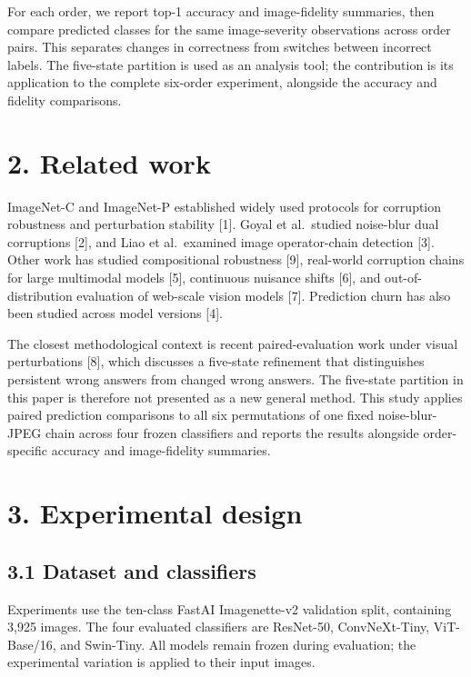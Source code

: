 \documentclass[10pt,twocolumn]{article}
\begin{document}
For each order, we report top-1 accuracy and image-fidelity summaries,
then compare predicted classes for the same image-severity observations
across order pairs. This separates changes in correctness from switches
between incorrect labels. The five-state partition is used as an
analysis tool; the contribution is its application to the complete
six-order experiment, alongside the accuracy and fidelity comparisons.

\section{2. Related work}\label{related-work}

ImageNet-C and ImageNet-P established widely used protocols for
corruption robustness and perturbation stability {[}1{]}. Goyal et
al.~studied noise-blur dual corruptions {[}2{]}, and Liao et
al.~examined image operator-chain detection {[}3{]}. Other work has
studied compositional robustness {[}9{]}, real-world corruption chains
for large multimodal models {[}5{]}, continuous nuisance shifts {[}6{]},
and out-of-distribution evaluation of web-scale vision models {[}7{]}.
Prediction churn has also been studied across model versions {[}4{]}.

The closest methodological context is recent paired-evaluation work
under visual perturbations {[}8{]}, which discusses a five-state
refinement that distinguishes persistent wrong answers from changed
wrong answers. The five-state partition in this paper is therefore not
presented as a new general method. This study applies paired prediction
comparisons to all six permutations of one fixed noise-blur-JPEG chain
across four frozen classifiers and reports the results alongside
order-specific accuracy and image-fidelity summaries.

\section{3. Experimental design}\label{experimental-design}

\subsection{3.1 Dataset and
classifiers}\label{dataset-and-classifiers}

Experiments use the ten-class FastAI Imagenette-v2 validation split,
containing 3,925 images. The four evaluated classifiers are ResNet-50,
ConvNeXt-Tiny, ViT-Base/16, and Swin-Tiny. All models remain frozen
during evaluation; the experimental variation is applied to their input
images.
\end{document}
